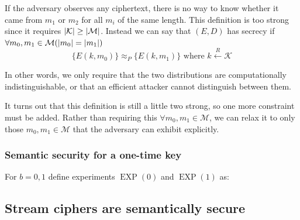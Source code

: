 \documentclass[10pt,a4paper]{report}
\begin{document}
If the adversary observes any ciphertext, there is no way to know whether it came from $m_1$ or
$m_2$ for all $m_i$ of the same length. This definition is too strong since it requires
$\abs{\mathcal{K}} \geq \abs{\mathcal{M}}$. Instead we can say that $(E, D)$ has secrecy if
$\forall m_0, m_1 \in \mathcal{M} (\abs{m_0} = \abs{m_1})$
    $$ \{E(k, m_0)\} \approx_P \{E(k, m_1)\} \text{ where } k \xleftarrow{R} \mathcal{K} $$

In other words, we only require that the two distributions are computationally indistinguishable,
or that an efficient attacker cannot distinguish between them.

It turns out that this definition is still a little two strong, so one more constraint must be
added. Rather than requiring this $\forall m_0, m_1 \in \mathcal{M}$, we can relax it to only those
$m_0, m_1 \in \mathcal{M}$ that the adversary can exhibit explicitly.

\subsubsection*{Semantic security for a one-time key}

For $b = 0,1$ define experiments $\operatorname{EXP}(0)$ and $\operatorname{EXP}(1)$ as:

\begin{figure}[H]
    \centering
\end{figure}

\subsection{Stream ciphers are semantically secure}
\end{document}
